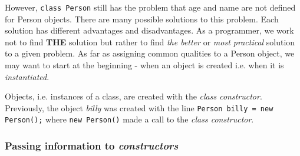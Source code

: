 \documentclass{article}
\begin{document}
\begin{flushleft}
However, \texttt{class Person} still has the problem that age and name are not defined for Person objects. There are many possible solutions to this problem. Each solution has different advantages and disadvantages. As a programmer, we work not to find \textbf{THE} solution but rather to find \emph{the better} or \emph{most practical} solution to a given problem. As far as assigning common qualities to a Person object, we may want to start at the beginning - when an object is created i.e. when it is \emph{instantiated}. \par
Objects, i.e. instances of a class, are created with the \emph{class constructor}. Previously, the object \emph{billy} was created with the line \texttt{Person billy = new Person();} where \texttt{new Person()} made a call to the \emph{class constructor}.\par

\subsubsection{Passing information to \emph{constructors}}
\label{code:simpleclassconstructor}



\end{flushleft}
\end{document}
